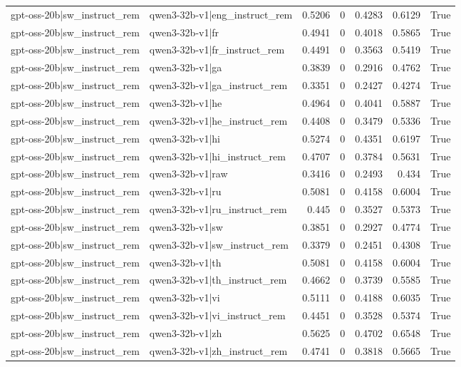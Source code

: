 \begin{table}
\begin{tabular}{l l r r r r l}
gpt-oss-20b|sw_instruct_rem & qwen3-32b-v1|eng_instruct_rem & 0.5206 & 0 & 0.4283 & 0.6129 & True \\
gpt-oss-20b|sw_instruct_rem & qwen3-32b-v1|fr & 0.4941 & 0 & 0.4018 & 0.5865 & True \\
gpt-oss-20b|sw_instruct_rem & qwen3-32b-v1|fr_instruct_rem & 0.4491 & 0 & 0.3563 & 0.5419 & True \\
gpt-oss-20b|sw_instruct_rem & qwen3-32b-v1|ga & 0.3839 & 0 & 0.2916 & 0.4762 & True \\
gpt-oss-20b|sw_instruct_rem & qwen3-32b-v1|ga_instruct_rem & 0.3351 & 0 & 0.2427 & 0.4274 & True \\
gpt-oss-20b|sw_instruct_rem & qwen3-32b-v1|he & 0.4964 & 0 & 0.4041 & 0.5887 & True \\
gpt-oss-20b|sw_instruct_rem & qwen3-32b-v1|he_instruct_rem & 0.4408 & 0 & 0.3479 & 0.5336 & True \\
gpt-oss-20b|sw_instruct_rem & qwen3-32b-v1|hi & 0.5274 & 0 & 0.4351 & 0.6197 & True \\
gpt-oss-20b|sw_instruct_rem & qwen3-32b-v1|hi_instruct_rem & 0.4707 & 0 & 0.3784 & 0.5631 & True \\
gpt-oss-20b|sw_instruct_rem & qwen3-32b-v1|raw & 0.3416 & 0 & 0.2493 & 0.434 & True \\
gpt-oss-20b|sw_instruct_rem & qwen3-32b-v1|ru & 0.5081 & 0 & 0.4158 & 0.6004 & True \\
gpt-oss-20b|sw_instruct_rem & qwen3-32b-v1|ru_instruct_rem & 0.445 & 0 & 0.3527 & 0.5373 & True \\
gpt-oss-20b|sw_instruct_rem & qwen3-32b-v1|sw & 0.3851 & 0 & 0.2927 & 0.4774 & True \\
gpt-oss-20b|sw_instruct_rem & qwen3-32b-v1|sw_instruct_rem & 0.3379 & 0 & 0.2451 & 0.4308 & True \\
gpt-oss-20b|sw_instruct_rem & qwen3-32b-v1|th & 0.5081 & 0 & 0.4158 & 0.6004 & True \\
gpt-oss-20b|sw_instruct_rem & qwen3-32b-v1|th_instruct_rem & 0.4662 & 0 & 0.3739 & 0.5585 & True \\
gpt-oss-20b|sw_instruct_rem & qwen3-32b-v1|vi & 0.5111 & 0 & 0.4188 & 0.6035 & True \\
gpt-oss-20b|sw_instruct_rem & qwen3-32b-v1|vi_instruct_rem & 0.4451 & 0 & 0.3528 & 0.5374 & True \\
gpt-oss-20b|sw_instruct_rem & qwen3-32b-v1|zh & 0.5625 & 0 & 0.4702 & 0.6548 & True \\
gpt-oss-20b|sw_instruct_rem & qwen3-32b-v1|zh_instruct_rem & 0.4741 & 0 & 0.3818 & 0.5665 & True \\

\end{tabular}
\end{table}
